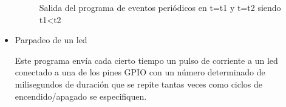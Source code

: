 \begin{itemize}
    \begin{figure}[htbp]
    \centering
    \caption{Salida del programa de eventos periódicos en t=t1 y t=t2 siendo t1<t2}
    \end{figure}


    \item Parpadeo de un led
    
    Este programa envía cada cierto tiempo un pulso de corriente a un led conectado a una de los pines GPIO con un número determinado de milisegundos de duración que se repite tantas veces como ciclos de encendido/apagado se especifiquen.
    
\end{itemize}
